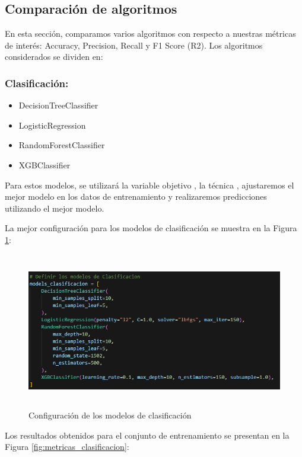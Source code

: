 \subsection{Comparación de algoritmos}

En esta sección, comparamos varios algoritmos con respecto a nuestras métricas de interés: Accuracy, Precision, Recall y F1 Score (R2). Los algoritmos considerados se dividen en:

\subsubsection*{Clasificación:}

\begin{itemize}
    \item DecisionTreeClassifier
    \item LogisticRegression
    \item RandomForestClassifier
    \item XGBClassifier
\end{itemize}

Para estos modelos, se utilizará la variable objetivo , la técnica , ajustaremos el mejor modelo en los datos de entrenamiento y realizaremos predicciones utilizando el mejor modelo.

La mejor configuración para los modelos de clasificación se muestra en la Figura \ref{fig:config_clasifiacion}:

\begin{figure}[H]
    \centering
    \includegraphics[width=6.0611in,height=2.6861in]{img/compara_algoritmos/configModelsClasificacion.png}
    \caption{Configuración de los modelos de clasificación}
    \label{fig:config_clasifiacion}
\end{figure}

Los resultados obtenidos para el conjunto de entrenamiento se presentan en la Figura \ref{fig:metricas_clasificacion}:

